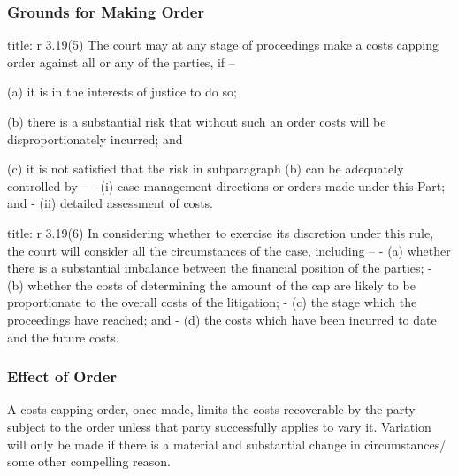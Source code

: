 \documentclass[
]{article}
\newenvironment{Shaded}{}{}
\newcommand{\NormalTok}[1]{#1}
\begin{document}
\hypertarget{grounds-for-making-order}{%
\subsubsection{Grounds for Making
Order}\label{grounds-for-making-order}}

\begin{Shaded}
\begin{Highlighting}[]
\NormalTok{title: r 3.19(5)}
\NormalTok{The court may at any stage of proceedings make a costs capping order against all or any of the parties, if –}

\NormalTok{(a) it is in the interests of justice to do so;}

\NormalTok{(b) there is a substantial risk that without such an order costs will be disproportionately incurred; and}

\NormalTok{(c) it is not satisfied that the risk in subparagraph (b) can be adequately controlled by –}
\NormalTok{{-} (i) case management directions or orders made under this Part; and}
\NormalTok{{-} (ii) detailed assessment of costs.}
\end{Highlighting}
\end{Shaded}

\begin{Shaded}
\begin{Highlighting}[]
\NormalTok{title: r 3.19(6)}
\NormalTok{In considering whether to exercise its discretion under this rule, the court will consider all the circumstances of the case, including –}
\NormalTok{{-} (a) whether there is a substantial imbalance between the financial position of the parties;}
\NormalTok{{-} (b) whether the costs of determining the amount of the cap are likely to be proportionate to the overall costs of the litigation;}
\NormalTok{{-} (c) the stage which the proceedings have reached; and}
\NormalTok{{-} (d) the costs which have been incurred to date and the future costs.}
\end{Highlighting}
\end{Shaded}

\hypertarget{effect-of-order}{%
\subsubsection{Effect of Order}\label{effect-of-order}}

A costs-capping order, once made, limits the costs recoverable by the
party subject to the order unless that party successfully applies to
vary it. Variation will only be made if there is a material and
substantial change in circumstances/ some other compelling reason.
\end{document}

